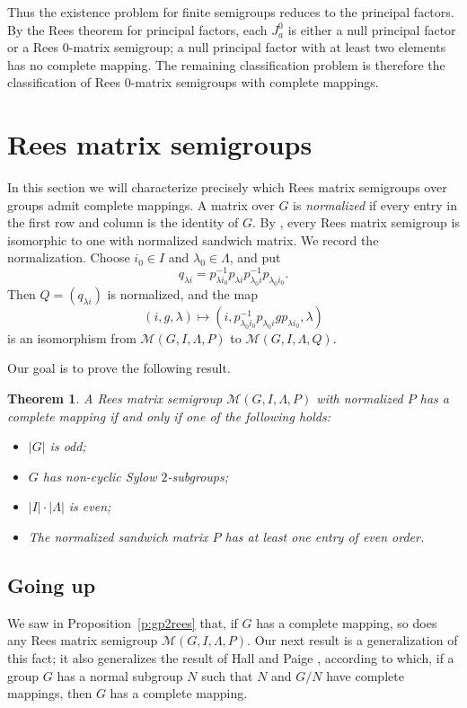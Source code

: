 \documentclass[11pt]{article}
\theoremstyle{plain}
\newtheorem{theorem}{Theorem}[section]
\theoremstyle{remark}
\theoremstyle{definition}
\theoremstyle{plain}
\begin{document}
Thus the existence problem for finite semigroups reduces to the principal factors. By the Rees theorem for principal factors, each $J_a^0$ is either a null principal factor or a Rees $0$-matrix semigroup; a null principal factor with at least two elements has no complete mapping. The remaining classification problem is therefore the classification of Rees $0$-matrix semigroups with complete mappings.

\section{Rees matrix semigroups}
\label{Sec:Reesmatrixsemigroups}

In this section we will characterize precisely which Rees matrix semigroups over groups admit complete mappings. A matrix over $G$ is \emph{normalized} if every entry in the first row and column is the identity of $G$. By \cite[Theorem~3.4.2]{Howie}, every Rees matrix semigroup is isomorphic to one with normalized sandwich matrix. We record the normalization. Choose $i_0\in I$ and $\lambda_0\in\Lambda$, and put
\[
q_{\lambda i}=p_{\lambda i_0}^{-1}p_{\lambda i}p_{\lambda_0 i}^{-1}p_{\lambda_0 i_0}.
\]
Then $Q=(q_{\lambda i})$ is normalized, and the map
\[
(i,g,\lambda)\longmapsto
(i,p_{\lambda_0 i_0}^{-1}p_{\lambda_0 i}g p_{\lambda i_0},\lambda)
\]
is an isomorphism from $\mathcal M(G,I,\Lambda,P)$ to $\mathcal M(G,I,\Lambda,Q)$.

Our goal is to prove the following result.

\begin{theorem}\label{t:ReesNon0}
A Rees matrix semigroup $\mathcal{M}(G,I,\Lambda,P)$ with normalized $P$ has a complete mapping if and only if one of the following holds:
\begin{itemize}\itemsep0pt
\item[(a)] $|G|$ is odd;
\item[(b)] $G$ has non-cyclic Sylow $2$-subgroups;
\item[(c)] $|I|\cdot |\Lambda|$ is even;
\item[(d)] The normalized sandwich matrix $P$ has at least one entry of even order.
\end{itemize}
\end{theorem}

\subsection{Going up}

We saw in Proposition~\ref{p:gp2rees} that, if $G$ has a complete mapping,
so does any Rees matrix semigroup $\mathcal{M}(G,I,\Lambda,P)$. Our next
result is a generalization of this fact; it also generalizes the result of
Hall and Paige \cite[Corollary~2]{hp}, according to which, if a group $G$ has a
normal subgroup $N$ such that $N$ and $G/N$ have complete mappings, then
$G$ has a complete mapping.
\end{document}
